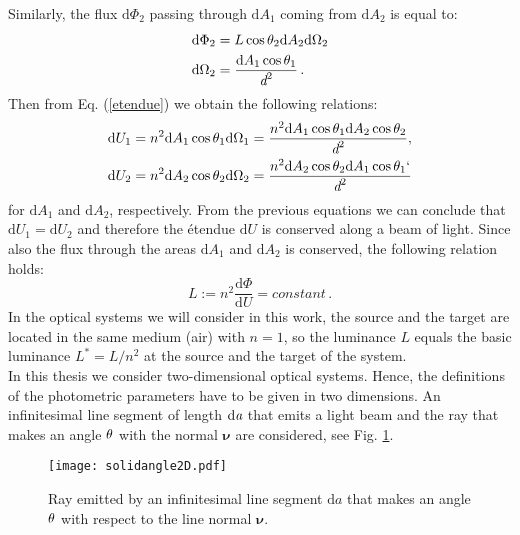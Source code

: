 Similarly, the flux $\textrm{d}\Phi_2$ passing through $\textrm{d}A_1$ coming from $\textrm{d}A_2$ is equal to:
\begin{equation}\begin{split}
\textrm{d}\Phi_2 &= L \cos\theta_2 \textrm{d}A_2 \textrm{d}\Omega_2\\
\textrm{d}\Omega_2 &= \frac{\textrm{d}A_1\cos\theta_1}{\textit{d}^2}\,.
\end{split}
\end{equation}
Then from Eq. (\ref{etendue}) we obtain the following relations: \begin{equation}
\begin{split}
\textrm{d}U_1 &= n^2 \textrm{d}A_1\cos\theta_1\textrm{d}\Omega_1= \frac{n^2 \textrm{d}A_1\cos\theta_1\textrm{d}A_2\cos\theta_2}{\textit{d}^2},\\
\textrm{d}U_2 &= n^2 \textrm{d}A_2\cos\theta_2\textrm{d}\Omega_2= \frac{ n^2 \textrm{d}A_2\cos\theta_2\textrm{d}A_1\cos\theta_1	`}{\textit{d}^2}
\end{split}
\end{equation}
for $\textrm{d}A_1$ and $\textrm{d}A_2$, respectively.
From the previous equations we can conclude that $\textrm{d}U_1=\textrm{d}U_2$ and therefore the \'{e}tendue $\textrm{d}U$ is conserved along a beam of light. 
Since also the flux through the areas $\textrm{d}A_1$ and $\textrm{d}A_2$ is conserved, the following relation holds:
\begin{equation}\label{basicluminance}
L := n^2 \frac{\textrm{d}\Phi}{\textrm{d}U} = constant\,.
\end{equation}
 In the optical systems we will consider in this work, the source and the target are located in the same medium (air) with $n=1$, so the luminance $L$ equals the basic luminance $L^* = L/n^2$ at the source and the target of the system.\\
\indent In this thesis we consider two-dimensional optical systems. 
 Hence, the definitions of the photometric parameters have to be given in two dimensions. An infinitesimal line segment of length $\textrm{d}\textit{a}$ that emits a light beam and the ray that makes an angle $\theta$ with the normal $\boldsymbol{\nu}$ are considered, see Fig. \ref{fig:2Dsolidangle}. 

\begin{figure}[h]
 \label{fig:2Dsolidangle}
     \begin{center}
     \texttt{[image: solidangle2D.pdf]}
     \end{center}
     \caption{Ray emitted by an infinitesimal line segment $\textrm{d}a$ that makes an angle $\theta$ with respect to the line normal $\boldsymbol{\nu}$.}
\label{fig:2Dsolidangle}
 \end{figure}

